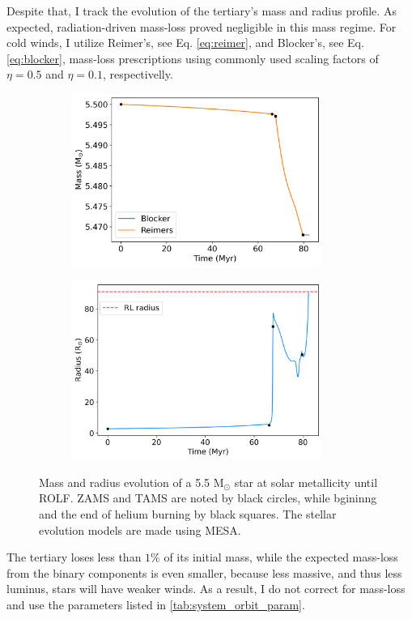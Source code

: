 Despite that, I track the evolution of the tertiary's mass and radius profile. As expected, radiation-driven mass-loss proved negligible in this mass regime. For cold winds, I utilize Reimer's, see Eq. \eqref{eq:reimer}, and Blocker's, see Eq. \eqref{eq:blocker}, mass-loss prescriptions using commonly used scaling factors of $\eta = 0.5$ and $\eta = 0.1$, respectivelly. 
\begin{figure}[H]
    \centering
    \begin{subfigure}{.5\textwidth}
    \centering
    \includegraphics[width=0.9\textwidth]{Thesis/graphs/giant_1-1mass_loss.pdf}
    \label{fig:mass_loss}
    \end{subfigure}%
    \begin{subfigure}{.5\textwidth}
    \centering
    \includegraphics[width=0.9\textwidth]{Thesis/graphs/giant_1-1radius.pdf}
    \label{fig:radius_profile}
    \end{subfigure}
    \caption{ Mass and radius evolution of a 5.5 M$_{\odot}$ star at solar metallicity until ROLF. ZAMS and TAMS are noted by black circles, while bgininng and the end of helium burning by black squares. The stellar evolution models are made using MESA\citep{paxton2010modules,paxton2013modules,paxton2015modules,paxton2019modules}.}
\end{figure}
The tertiary loses less than $1\%$ of its 
initial mass, while the expected mass-loss from the binary components is even smaller, because less massive, and thus less luminus, stars will have weaker winds. As a result, I do not correct for mass-loss and use the parameters listed in  \cref{tab:system_orbit_param}.

